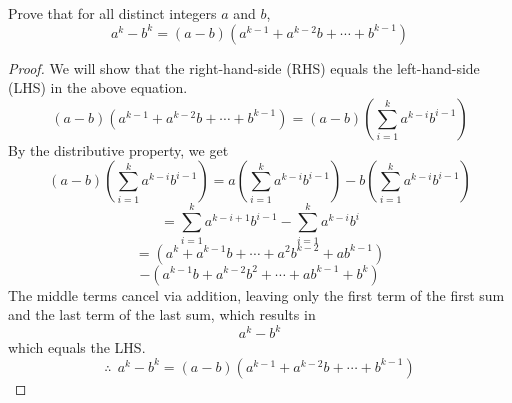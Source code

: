 \begin{example}
Prove that for all distinct integers $a$ and $b$, 
\[a^k-b^k = (a-b)(a^{k-1} + a^{k-2}b + \cdots + b^{k-1})\]
\end{example}
\begin{proof}
We will show that the right-hand-side (RHS) equals the left-hand-side (LHS) in the above equation.
\[
(a-b)(a^{k-1} + a^{k-2}b + \cdots + b^{k-1}) = (a-b)\left(\sum_{i=1}^{k}{a^{k-i}b^{i-1}}\right)
\]
By the distributive property, we get
\[
(a-b)\left(\sum_{i=1}^{k}{a^{k-i}b^{i-1}}\right) = a \left(\sum_{i=1}^{k}{a^{k-i}b^{i-1}}\right) - b\left(\sum_{i=1}^{k}{a^{k-i}b^{i-1}}\right)
\]
\[
= \sum_{i=1}^{k}{a^{k-i+1}b^{i-1}} - \sum_{i=1}^{k}{a^{k-i}b^{i}}
\]
\[
= (a^{k} + a^{k-1}b + \cdots + a^2b^{k-2} + ab^{k-1} ) 
\]
\[
- (a^{k-1}b + a^{k-2}b^2 + \cdots + ab^{k-1} + b^k)
\]
The middle terms cancel via addition, leaving only the first term of the first sum and the last term of the last sum, which results in 
\[
a^k - b^k
\]
which equals the LHS.
\[
\therefore ~~ a^k-b^k = (a-b)(a^{k-1} + a^{k-2}b + \cdots + b^{k-1})
\]
\end{proof}

